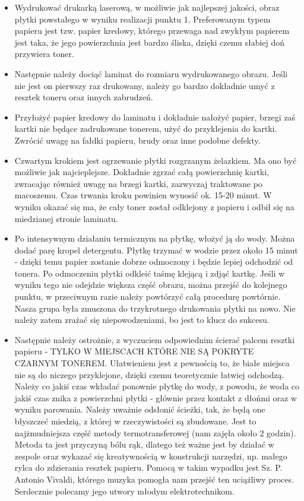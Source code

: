 \begin{itemize}
\item Wydrukować drukarką laserową, w możliwie jak najlepszej jakości, obraz płytki powstałego w wyniku realizacji punktu 1. Preferowanym typem papieru jest tzw. papier kredowy, którego przewaga nad zwykłym papierem jest taka, że  jego powierzchnia jest bardzo śliska, dzięki czemu słabiej doń przywiera toner.
\item Następnie należy dociąć laminat do rozmiaru wydrukowanego obrazu. Jeśli nie jest on pierwszy raz drukowany, należy go bardzo dokładnie umyć z resztek toneru oraz innych zabrudzeń.
\item Przyłożyć papier kredowy do laminatu i dokładnie nałożyć papier, brzegi zaś kartki nie będące zadrukowane tonerem, użyć do przyklejenia do kartki. Zwrócić uwagę na fałdki papieru, brudy oraz inne podobne defekty.
\item Czwartym krokiem jest ogrzewanie płytki rozgrzanym żelazkiem. Ma ono być możliwie jak najcieplejsze. Dokładnie zgrzać całą powierzchnię kartki, zwracając również uwagę na brzegi kartki, zazwyczaj traktowane po macoszemu. Czas trwania kroku powinien wynosić ok. 15-20 minut. W wyniku okazać się ma, że cały toner został odklejony z papieru i odbił się na miedzianej stronie laminatu.
\item Po intensywnym działaniu termicznym na płytkę, włożyć ją do wody. Można dodać parę kropel detergentu. Płytkę trzymać w wodzie przez około 15 minut - dzięki temu papier zostanie dobrze odmoczony i będzie lepiej odchodzić od tonera. Po odmoczeniu płytki odkleić taśmę klejącą i zdjąć kartkę. Jeśli w wyniku tego nie odejdzie większa część obrazu, można przejść do kolejnego punktu, w przeciwnym razie należy powtórzyć całą procedurę powtórnie. Nasza grupa była zmuszona do trzykrotnego drukowania płytki na nowo. Nie należy zatem zrażać się niepowodzeniami, bo jest to klucz do sukcesu.
\item Następnie należy ostrożnie, z wyczuciem odpowiednim ścierać palcem resztki papieru - TYLKO W MIEJSCACH KTÓRE NIE SĄ POKRYTE CZARNYM TONEREM. Ułatwieniem jest z pewnością to, że białe miejsca nie są do niczego przyklejone, dzięki czemu teoretycznie łatwiej odchodzą. Należy co jakiś czas wkładać ponownie płytkę do wody, z powodu, że woda co jakiś czas znika z powierzchni płytki - głównie przez kontakt z dłońmi oraz w wyniku parowania. Należy uważnie odsłonić ścieżki, tak, że będą one błyszczeć miedzią, z której w rzeczywistości są zbudowane. Jest to najżmudniejsza część metody termotransferowej (nam zajęła około 2 godzin). Metoda ta jest przyczyną bólu rąk, dlatego też ważne jest by działać w zespole oraz wykazać się kreatywnością w konstrukcji narzędzi, np. małego rylca do zdzierania resztek papieru. Pomocą w takim wypadku jest Sz. P. Antonio Vivaldi, którego muzyka pomogła nam przejść ten uciążliwy proces. Serdecznie polecamy jego utwory młodym elektrotechnikom.
\end{itemize}

